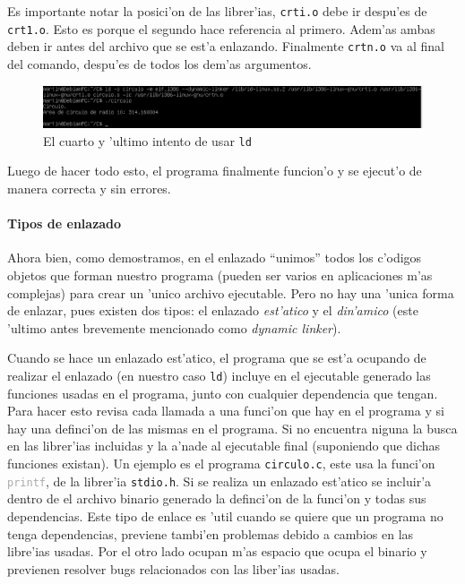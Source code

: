 \documentclass[11pt]{article}
\newcommand{\subsubsubsection}[1]{\paragraph{#1}\mbox{}}
\begin{document}
		Es importante notar la posici'on de las librer'ias, \texttt{crti.o} debe ir despu'es de \texttt{crt1.o}. Esto es porque el segundo hace referencia al primero. Adem'as ambas deben ir antes del archivo que se est'a enlazando. Finalmente \texttt{crtn.o} va al final del comando, despu'es de todos los dem'as argumentos.
		
		\begin{figure}[H]
			\centering
			\includegraphics[width=.9\linewidth]{Images/Seccion 1/S1 parte nueve.PNG}
			\caption{El cuarto y 'ultimo intento de usar \texttt{ld}}
			\label{fig:fourth-ld-attempt}
		\end{figure}
		
		Luego de hacer todo esto, el programa finalmente funcion'o y se ejecut'o de manera correcta y sin errores. 


		\subsubsubsection{Tipos de enlazado}

		Ahora bien, como demostramos, en el enlazado ``unimos'' todos los c'odigos objetos que forman nuestro programa (pueden ser varios en aplicaciones m'as complejas) para crear un 'unico archivo ejecutable. Pero no hay una 'unica forma de enlazar, pues existen dos tipos: el enlazado \textit{est'atico} y el \textit{din'amico} (este 'ultimo antes brevemente mencionado como \textit{dynamic linker}).
		
		
		Cuando se hace un enlazado est'atico, el programa que se est'a ocupando de realizar el enlazado (en nuestro caso \texttt{ld}) incluye en el ejecutable generado las funciones usadas en el programa, junto con cualquier dependencia que tengan. Para hacer esto revisa cada llamada a una funci'on que hay en el programa y si hay una definci'on de las mismas en el programa. Si no encuentra niguna la busca en las librer'ias incluidas y la a'nade al ejecutable final (suponiendo que dichas funciones existan). Un ejemplo es el programa  \texttt{circulo.c}, este usa la funci'on \texttt{\textcolor{darkgray}{printf}}, de la librer'ia \texttt{\textcolor{orange-desert-vim}{stdio.h}}. Si se realiza un enlazado est'atico se incluir'a dentro de el archivo binario generado la definci'on de la funci'on y todas sus dependencias. Este tipo de enlace es 'util cuando se quiere que un programa no tenga dependencias, previene tambi'en problemas debido a cambios en las libre'ias usadas. Por el otro lado ocupan m'as espacio que ocupa el binario y previenen resolver bugs relacionados con las liber'ias usadas.
\end{document}
